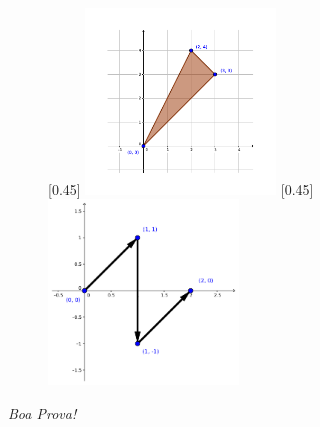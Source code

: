 \documentclass[a4paper,5pt]{amsbook}
\begin{document}
\begin{enumerate}
	\begin{figure}[h]
		\centering{}
		[0.45\textwidth]{%
			\includegraphics[width=0.45\textwidth]{ex4.pdf}
		}
		\quad
		[0.45\textwidth]{%
			\includegraphics[width=0.45\textwidth]{ex5.pdf}
		}
	\end{figure}
\end{enumerate}

\begin{flushright}
	\textit{Boa Prova!}
\end{flushright}
\end{document}
